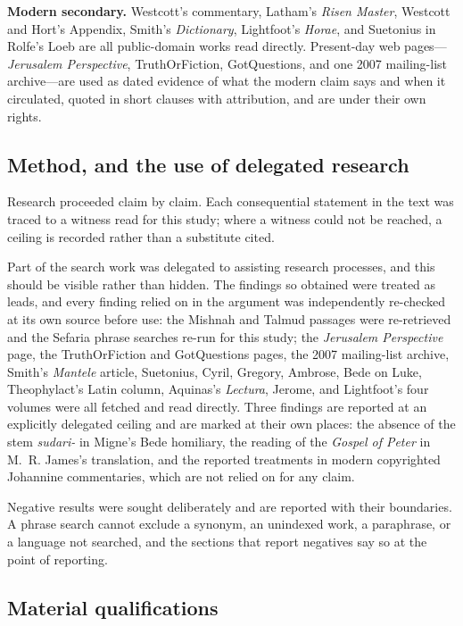 \textbf{Modern secondary.} Westcott's commentary, Latham's \emph{Risen Master},
Westcott and Hort's Appendix, Smith's \emph{Dictionary}, Lightfoot's
\emph{Horae}, and Suetonius in Rolfe's Loeb are all public-domain works read
directly. Present-day web pages---\emph{Jerusalem Perspective}, TruthOrFiction,
GotQuestions, and one 2007 mailing-list archive---are used as dated evidence of
what the modern claim says and when it circulated, quoted in short clauses with
attribution, and are under their own rights.

\subsection{Method, and the use of delegated research}

Research proceeded claim by claim. Each consequential statement in the text was
traced to a witness read for this study; where a witness could not be reached, a
ceiling is recorded rather than a substitute cited.

Part of the search work was delegated to assisting research processes, and this
should be visible rather than hidden. The findings so obtained were treated as
leads, and every finding relied on in the argument was independently re-checked
at its own source before use: the Mishnah and Talmud passages were re-retrieved
and the Sefaria phrase searches re-run for this study; the \emph{Jerusalem
Perspective} page, the TruthOrFiction and GotQuestions pages, the 2007
mailing-list archive, Smith's \emph{Mantele} article, Suetonius, Cyril,
Gregory, Ambrose, Bede on Luke, Theophylact's Latin column, Aquinas's
\emph{Lectura}, Jerome, and Lightfoot's four volumes were all fetched and read
directly. Three findings are reported at an explicitly delegated ceiling and are
marked at their own places: the absence of the stem \emph{sudari-} in Migne's
Bede homiliary, the reading of the \emph{Gospel of Peter} in M.~R. James's
translation, and the reported treatments in modern copyrighted Johannine
commentaries, which are not relied on for any claim.

Negative results were sought deliberately and are reported with their
boundaries. A phrase search cannot exclude a synonym, an unindexed work, a
paraphrase, or a language not searched, and the sections that report negatives
say so at the point of reporting.

\subsection{Material qualifications}

